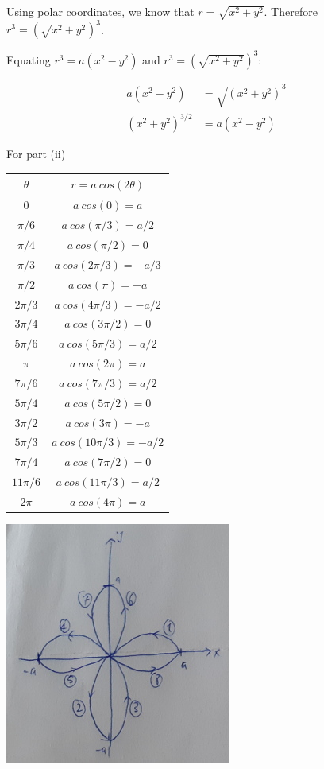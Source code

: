 \documentclass[9pt]{article}
\begin{document}
Using polar coordinates, we know that $r = \sqrt{x^2 + y^2}$. Therefore $r^3 = (\sqrt{x^2 + y^2})^3$.

Equating $r^3 = a(x^2 - y^2)$ and $r^3 = (\sqrt{x^2 + y^2})^3$:

\begin{align*}
  a(x^2 - y^2) &= \sqrt{(x^2 + y^2)}^{3} \\
  (x^2 + y^2)^{3/2} &= a(x^2 - y^2)
\end{align*}

For part (ii)

\begin{center}
  \begin{tabular}{|c|c|}
    \hline
    \rowcolor{Gray}
    $\theta$ & $r = a\ cos(2 \theta)$ \\ \hline
    $0$ & $a\ cos(0) = a$ \\ \hline
    $\pi / 6$ & $a\ cos(\pi / 3) = a / 2$ \\ \hline
    $\pi / 4$ & $a\ cos(\pi / 2) = 0$ \\ \hline
    $\pi / 3$ & $a\ cos(2 \pi / 3) = -a / 3$ \\ \hline
    $\pi / 2$ & $a\ cos(\pi) = -a$ \\ \hline
    $2 \pi / 3$ & $a\ cos(4 \pi / 3) = -a / 2$ \\ \hline
    $3 \pi / 4$ & $a\ cos(3 \pi / 2) = 0$ \\ \hline
    $5 \pi / 6$ & $a\ cos(5 \pi / 3) = a / 2$ \\ \hline
    $\pi$ & $a\ cos(2 \pi) = a$ \\ \hline
    $7 \pi / 6$ & $a\ cos(7 \pi / 3) = a / 2$ \\ \hline
    $5 \pi / 4$ & $a\ cos(5 \pi / 2) = 0$ \\ \hline
    $3 \pi / 2$ & $a\ cos(3 \pi) = -a$ \\ \hline
    $5 \pi / 3$ & $a\ cos(10 \pi / 3) = -a / 2$ \\ \hline
    $7 \pi / 4$ & $a\ cos(7 \pi / 2) = 0$ \\ \hline
    $11 \pi / 6$ & $a\ cos(11 \pi / 3) = a / 2$ \\ \hline
    $2 \pi$ & $a\ cos(4 \pi) = a$ \\ \hline
  \end{tabular}
\end{center}

\begin{center}
  \includegraphics[scale=0.8]{p1_4h3.jpg}
\end{center}
\end{document}
